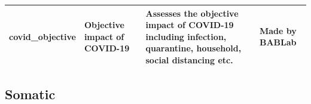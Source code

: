 \documentclass[]{book}
\begin{document}
\begin{longtable}[]{@{}llll@{}}
\begin{minipage}[t]{0.22\columnwidth}
covid\_objective\strut
\end{minipage} & \begin{minipage}[t]{0.27\columnwidth}\raggedright
Objective impact of COVID-19\strut
\end{minipage} & \begin{minipage}[t]{0.22\columnwidth}\raggedright
Assesses the objective impact of COVID-19 including infection, quarantine, household, social distancing etc.\strut
\end{minipage} & \begin{minipage}[t]{0.18\columnwidth}\raggedright
Made by BABLab\strut
\end{minipage}\tabularnewline
\bottomrule
\end{longtable}

\hypertarget{somatic-1}{%
\subsection{Somatic}\label{somatic-1}}
\end{document}
